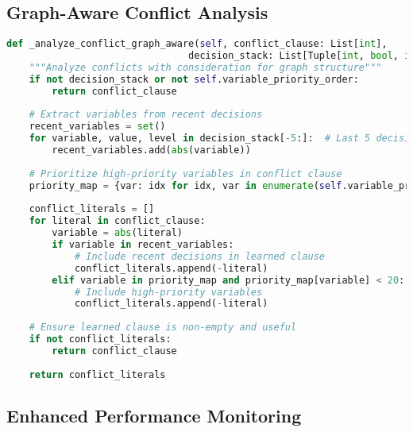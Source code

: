 \subsection{Graph-Aware Conflict Analysis}
\label{appendix:conflict-analysis}

\begin{lstlisting}[language=Python, caption=Graph-Aware Conflict Analysis]
def _analyze_conflict_graph_aware(self, conflict_clause: List[int], 
                                decision_stack: List[Tuple[int, bool, int]]) -> List[int]:
    """Analyze conflicts with consideration for graph structure"""
    if not decision_stack or not self.variable_priority_order:
        return conflict_clause
    
    # Extract variables from recent decisions
    recent_variables = set()
    for variable, value, level in decision_stack[-5:]:  # Last 5 decisions
        recent_variables.add(abs(variable))
    
    # Prioritize high-priority variables in conflict clause
    priority_map = {var: idx for idx, var in enumerate(self.variable_priority_order)}
    
    conflict_literals = []
    for literal in conflict_clause:
        variable = abs(literal)
        if variable in recent_variables:
            # Include recent decisions in learned clause
            conflict_literals.append(-literal)
        elif variable in priority_map and priority_map[variable] < 20:
            # Include high-priority variables
            conflict_literals.append(-literal)
    
    # Ensure learned clause is non-empty and useful
    if not conflict_literals:
        return conflict_clause
    
    return conflict_literals
\end{lstlisting}

\subsection{Enhanced Performance Monitoring}
\label{appendix:performance-monitoring}


